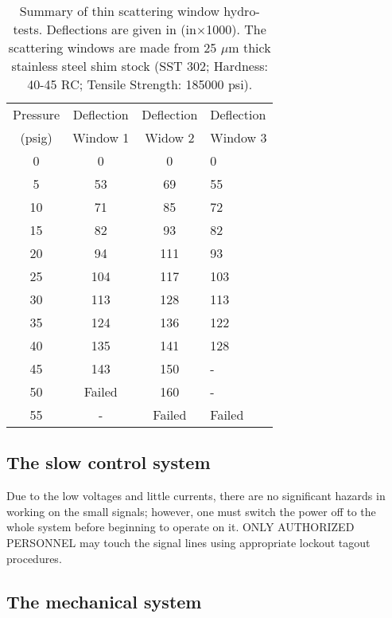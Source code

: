 %
\begin{table}
\begin{center}\begin{tabular}{|c|c|c|p{2in}|}
\hline 
Pressure&
\multicolumn{1}{c|}{Deflection}&
\multicolumn{1}{c|}{Deflection}&
\multicolumn{1}{p{2in}|}{Deflection}\\
(psig)&
\multicolumn{1}{c|}{Window 1}&
Widow 2&
Window 3\\
\hline
\hline 
0&
0&
0&
0\\
\hline
5&
53&
69&
55\\
\hline
10&
71&
85&
72\\
\hline
15&
82&
93&
82\\
\hline
20&
94&
111&
93\\
\hline
25&
104&
117&
103\\
\hline
30&
113&
128&
113\\
\hline
35&
124&
136&
122\\
\hline
40&
135&
141&
128\\
\hline
45&
143&
150&
-\\
\hline
50&
Failed&
160&
-\\
\hline
55&
-&
Failed&
Failed\\
\hline
\end{tabular}\end{center}


\caption{Summary of thin scattering window hydro-tests. Deflections are given
in (in$\times $1000). The scattering windows are made from 25 $\mu $m
thick stainless steel shim stock (SST 302; Hardness: 40-45 RC; Tensile
Strength: 185000 psi). \label{tab: window-table}}
\end{table}



\subsection{The slow control system}

Due to the low voltages and little currents, there are no significant
hazards in working on the small signals; however, one must switch
the power off to the whole system before beginning to operate on it.
ONLY AUTHORIZED PERSONNEL may touch the signal lines using appropriate
lockout tagout procedures.


\subsection{The mechanical system}

